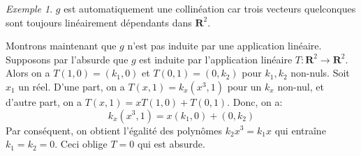 \documentclass[10pt, oneside]{memoir}
\theoremstyle{definition}
\newtheorem{defn}{Définition}
\theoremstyle{remark}
\newtheorem{exm}{Exemple}
\newcommand*{\DashedArrow}[1][]{\mathbin{\tikz
    [baseline=-0.25ex,-latex, dashed,#1] \draw [#1] (0pt,0.5ex) --
    (1.3em,0.5ex);}}%
\newcommand{\partialto}{\DashedArrow[->,dash pattern=on 4pt off 2pt]}
\DeclareMathOperator{\kernel}{Ker}
\DeclareMathOperator{\domain}{Dom}
\newcommand{\R}{\mathbf{R}}
\begin{document}
\begin{exm}
  $g$ est automatiquement une collinéation car trois vecteurs quelconques sont
  toujours linéairement dépendants dans $\R^2$.

  Montrons maintenant que $g$ n'est pas induite par une application linéaire.
  Supposons par l'absurde que $g$ est induite par l'application linéaire
  $T : \R^{2} \to \R^{2}$. Alors on a $T(1, 0) = (k_{1}, 0)$ et
  $T(0, 1) = (0, k_{2})$ pour $k_{1}, k_{2}$ non-nuls. Soit $x_{1}$ un réel.
  D'une part, on a $T(x, 1) = k_{x} (x^{3}, 1)$ pour un $k_{x}$ non-nul, et
  d'autre part, on a $T(x, 1) = x T(1, 0) + T(0, 1)$. Donc, on a:
  $$
  k_{x} (x^{3}, 1) = x (k_{1}, 0) + (0, k_{2})
  $$
  Par conséquent, on obtient l'égalité des polynômes $k_{2}x^{3} = k_{1}x$ qui
  entraîne $k_{1} = k_{2} = 0$. Ceci oblige $T = 0$ qui est absurde.
\end{exm}
\end{document}
